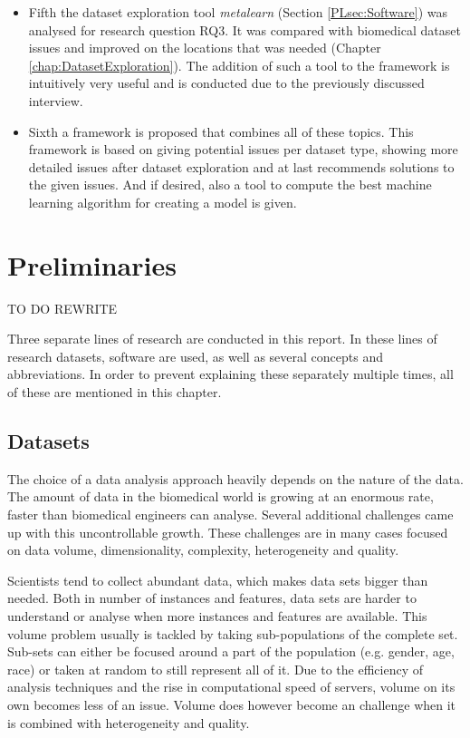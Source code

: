 \documentclass[10pt,a4paper]{report}
\begin{document}
\begin{itemize}
		\item Fifth the dataset exploration tool \textit{metalearn} (Section \ref{PLsec:Software}) was analysed for research question RQ3. It was compared with biomedical dataset issues and improved on the locations that was needed (Chapter \ref{chap:DatasetExploration}). The addition of such a tool to the framework is intuitively very useful and is conducted due to the previously discussed interview.
		
		\item Sixth a framework is proposed that combines all of these topics. This framework is based on giving potential issues per dataset type, showing more detailed issues after dataset exploration and at last recommends solutions to the given issues. And if desired, also a tool to compute the best machine learning algorithm for creating a model is given.
	\end{itemize} 
	
	\chapter{Preliminaries}
	\label{chap:Preliminaries}
	
	TO DO REWRITE
	
	Three separate lines of research are conducted in this report. In these lines of research datasets, software are used, as well as several concepts and abbreviations. In order to prevent explaining these separately multiple times, all of these are mentioned in this chapter.
		
	\section{Datasets}
	\label{PLsec:Datasets}
	
	The choice of a data analysis approach heavily depends on the nature of the data. The amount of data in the biomedical world is growing at an enormous rate, faster than biomedical engineers can analyse. Several additional challenges came up with this uncontrollable growth. These challenges are in many cases focused on data volume, dimensionality, complexity, heterogeneity and quality\cite{chen2006medical, doi:10.1093/bib/bbx044}.
	
	Scientists tend to collect abundant data, which makes data sets bigger than needed. Both in number of instances and features, data sets are harder to understand or analyse when more instances and features are available.\cite{chen2006medical} This volume problem usually is tackled by taking sub-populations of the complete set. Sub-sets can either be focused around a part of the population (e.g. gender, age, race) or taken at random to still represent all of it. Due to the efficiency of analysis techniques and the rise in computational speed of servers\cite{blythe2008rise}, volume on its own becomes less of an issue. Volume does however become an challenge when it is combined with heterogeneity and quality\cite{Turkay2014, Holzinger2014}.
	
\end{document}
